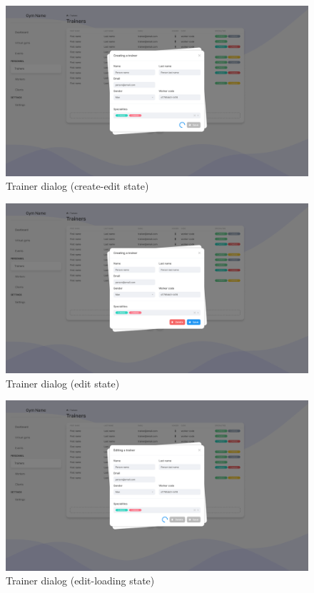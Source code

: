 \documentclass[a4paper, 12pt, oneside]{book}
\begin{document}
\begin{figure}[h!]
	\centering
	\includegraphics[width=\textwidth]{assets/ui/TrainerCreateLoading.png}
	\caption{Trainer dialog (create-edit state)}
\end{figure}
\begin{figure}[h!]
	\centering
	\includegraphics[width=\textwidth]{assets/ui/TrainerEdit.png}
	\caption{Trainer dialog (edit state)}
\end{figure}
\begin{figure}[h!]
	\centering
	\includegraphics[width=\textwidth]{assets/ui/TrainerEditLoading.png}
	\caption{Trainer dialog (edit-loading state)}
\end{figure}
\end{document}
